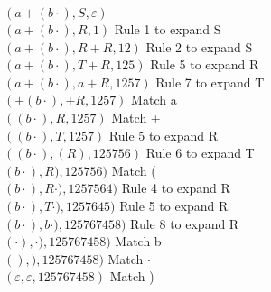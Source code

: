 \noindent $(a + (b \cdot), S, \varepsilon)$ \\
$(a + (b \cdot), R, 1)$ Rule 1 to expand S \\
$(a + (b \cdot), R+R, 12)$ Rule 2 to expand S \\
$(a + (b \cdot), T+R, 125)$ Rule 5 to expand R \\
$(a + (b \cdot), a+R, 1257)$ Rule 7 to expand T \\
$( + (b \cdot), +R, 1257)$ Match a\\
$( (b \cdot), R, 1257)$ Match +\\
$( (b \cdot), T, 1257)$ Rule 5 to expand R\\
$( (b \cdot), (R), 125756)$ Rule 6 to expand T\\
$( b \cdot), R), 125756)$ Match (\\
$( b \cdot), R \cdot), 1257564)$ Rule 4 to expand R\\
$( b \cdot), T \cdot), 1257645)$ Rule 5 to expand R\\
$( b \cdot), b \cdot), 125767458)$ Rule 8 to expand R\\
$( \cdot), \cdot), 125767458)$ Match b\\
$( ), ), 125767458)$ Match $\cdot$\\
$( \varepsilon, \varepsilon, 125767458)$ Match )\\
